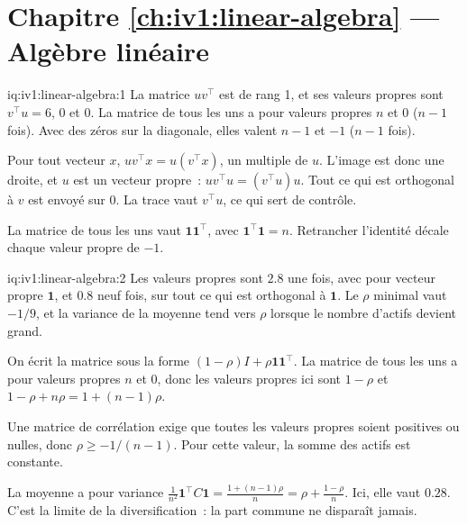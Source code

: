 \section*{Chapitre \ref{ch:iv1:linear-algebra} --- Algèbre linéaire}

\begin{solution}{iq:iv1:linear-algebra:1}
La matrice $uv^\top$ est de rang 1, et ses valeurs propres sont $v^\top u = 6$, 0 et 0. La matrice de tous les uns a pour valeurs propres $n$ et $0$ ($n - 1$ fois). Avec des zéros sur la diagonale, elles valent $n - 1$ et $-1$ ($n - 1$ fois).

Pour tout vecteur $x$, $uv^\top x = u(v^\top x)$, un multiple de $u$. L'image est donc une droite, et $u$ est un vecteur propre~: $uv^\top u = (v^\top u)u$. Tout ce qui est orthogonal à $v$ est envoyé sur 0. La trace vaut $v^\top u$, ce qui sert de contrôle.

La matrice de tous les uns vaut $\mathbf{1}\mathbf{1}^\top$, avec $\mathbf{1}^\top\mathbf{1} = n$. Retrancher l'identité décale chaque valeur propre de $-1$.

\end{solution}

\begin{solution}{iq:iv1:linear-algebra:2}
Les valeurs propres sont $2.8$ une fois, avec pour vecteur propre $\mathbf{1}$, et $0.8$ neuf fois, sur tout ce qui est orthogonal à $\mathbf{1}$. Le $\rho$ minimal vaut $-1/9$, et la variance de la moyenne tend vers $\rho$ lorsque le nombre d'actifs devient grand.

On écrit la matrice sous la forme $(1 - \rho)I + \rho\mathbf{1}\mathbf{1}^\top$. La matrice de tous les uns a pour valeurs propres $n$ et 0, donc les valeurs propres ici sont $1 - \rho$ et $1 - \rho + n\rho = 1 + (n - 1)\rho$.

Une matrice de corrélation exige que toutes les valeurs propres soient positives ou nulles, donc $\rho \ge -1/(n - 1)$. Pour cette valeur, la somme des actifs est constante.

La moyenne a pour variance $\frac{1}{n^2}\mathbf{1}^\top C\mathbf{1} = \frac{1 + (n - 1)\rho}{n} = \rho + \frac{1 - \rho}{n}$. Ici, elle vaut $0.28$. C'est la limite de la diversification~: la part commune ne disparaît jamais.

\end{solution}

